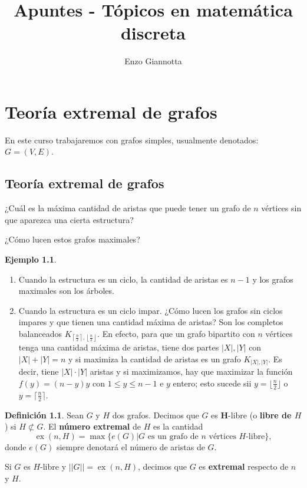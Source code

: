 \documentclass[12pt]{report}
\title{Apuntes - Tópicos en matemática discreta}
\author{Enzo Giannotta}
\theoremstyle{plain}
\theoremstyle{definition}
\newtheorem{definition}[theorem]{Definición}
\newtheorem{example}[theorem]{Ejemplo}
\newcommand{\abs}[1]{\left \vert #1 \right \vert}
\newcommand{\Abs}[1]{\left \vert \left \vert #1 \right \vert \right \vert}
\newcommand{\ceil}[1]{\left\lceil #1  \right\rceil}
\newcommand{\floor}[1]{\left\lfloor #1  \right\rfloor}
\newcommand{\ex}[2]{\operatorname{ex} (#1, #2)}
\begin{document}
\maketitle


\tableofcontents







\chapter{Teoría extremal de grafos}

En este curso trabajaremos con grafos simples, usualmente denotados: $G=(V,E)$.

\section{Teoría extremal de grafos}

¿Cuál es la máxima cantidad de aristas que puede tener un grafo de $n$ vértices sin que aparezca una cierta estructura?

¿Cómo lucen estos grafos maximales?

\begin{example}
\begin{enumerate}
\item Cuando la estructura es un ciclo, la cantidad de aristas es $n-1$ y los grafos maximales son los árboles.
\item Cuando la estructura es un ciclo impar. ¿Cómo lucen los grafos sin ciclos impares y que tienen una cantidad máxima de aristas? Son los completos balanceados $K_{\ceil {\frac n 2},\floor{\frac n 2}}$. En efecto, para que un grafo bipartito con $n$ vértices tenga una cantidad máxima de aristas, tiene dos partes $\abs X, \abs Y$ con $\abs X + \abs Y = n$ y si maximiza la cantidad de aristas es un grafo $K_{\abs X, \abs Y}$. Es decir, tiene $\abs X \cdot \abs Y$ aristas y si maximizamos, hay que maximizar la función $f(y) = (n-y)y$ con $1 \leq y \leq n-1$ e $y$ entero; esto sucede sii $y = \lfloor {\frac n 2} \rfloor$ o $y = \lceil \frac n 2 \rceil$.
\end{enumerate}
\end{example}

\begin{definition}
Sean $G$ y $H$ dos grafos. Decimos que $G$ es \textbf{H}-libre (o \textbf{libre de $H$}) si $H \nsubset G$. El \textbf{número extremal} de $H$ es la cantidad
\[
    \ex n H = \max \{e (G) | G \text{ es un grafo de $n$ vértices $H$-libre}\},
\]
donde $e(G)$ siempre denotará el número de aristas de $G$.

Si $G$ es $H$-libre y $\Abs G = \ex n H$, decimos que $G$ es \textbf{extremal} respecto de $n$ y $H$.
\end{definition}
\end{document}
